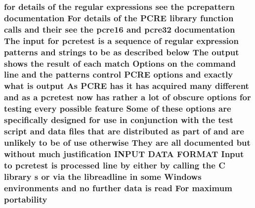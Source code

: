 \subsubsection[{\texorpdfstring{portability}{portability}}]{\setlength{\rightskip}{0pt plus 5cm}for {\bf details} {\bf of} the regular {\bf expressions} see the {\bf pcrepattern} {\bf documentation} For {\bf details} {\bf of} the {\bf P\+C\+RE} {\bf library} {\bf function} {\bf calls} and their see the {\bf pcre16} and {\bf pcre32} {\bf documentation} The {\bf input} for {\bf pcretest} {\bf is} {\bf a} {\bf sequence} {\bf of} regular {\bf expression} {\bf patterns} and {\bf strings} {\bf to} {\bf be} {\bf as} described {\bf below} The {\bf output} shows the {\bf result} {\bf of} each {\bf match} Options {\bf on} the {\bf command} {\bf line} and the {\bf patterns} control {\bf P\+C\+RE} {\bf options} and {\bf exactly} {\bf what} {\bf is} {\bf output} As {\bf P\+C\+RE} has {\bf it} has acquired many different and {\bf as} {\bf a} {\bf pcretest} {\bf now} has rather {\bf a} lot {\bf of} obscure {\bf options} for testing every {\bf possible} {\bf feature} Some {\bf of} these {\bf options} {\bf are} specifically designed for use {\bf in} conjunction {\bf with} the test {\bf script} and {\bf data} {\bf files} that {\bf are} {\bf distributed} {\bf as} part {\bf of} and {\bf are} unlikely {\bf to} {\bf be} {\bf of} use otherwise They {\bf are} {\bf all} documented but without much justification I\+N\+P\+UT {\bf D\+A\+TA} F\+O\+R\+M\+AT Input {\bf to} {\bf pcretest} {\bf is} processed {\bf line} by either by calling the {\bf C} {\bf library} {\bf s} {\bf or} via the libreadline {\bf in} some {\bf Windows} {\bf environments} and no further {\bf data} {\bf is} {\bf read} For maximum portability}\hypertarget{pcretest_8txt_a445b1c9d8a0332e7e47b676080ae84e0}{}\label{pcretest_8txt_a445b1c9d8a0332e7e47b676080ae84e0}
